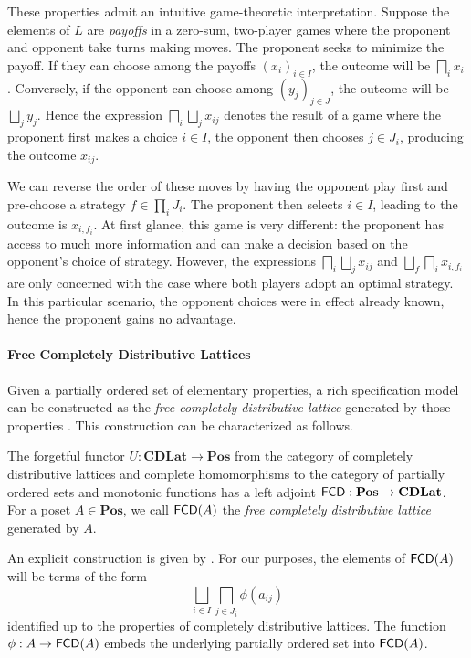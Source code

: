 \documentclass[sigplan,10pt,authordraft]{acmart}
\begin{document}
These properties admit an intuitive game-theoretic interpretation.
Suppose the elements of $L$
are \emph{payoffs} in a zero-sum, two-player games
where the proponent and opponent
take turns making moves.
The proponent seeks to minimize the payoff.
If they can choose among the payoffs $(x_i)_{i \in I}$,
the outcome will be $\bigsqcap_i x_i$.
Conversely,
if the opponent can choose among $(y_j)_{j \in J}$,
the outcome will be $\bigsqcup_j y_j$.
Hence the expression
$\bigsqcap_i \bigsqcup_j x_{ij}$
denotes the result of a game where
the proponent first makes a choice $i \in I$,
the opponent then chooses $j \in J_i$,
producing the outcome $x_{ij}$.

We can reverse the order of these moves
by having the opponent play first
and pre-choose a strategy $f \in \prod_i J_i$.
The proponent then selects $i \in I$,
leading to the outcome is $x_{i,f_i}$.
At first glance,
this game is very different:
the proponent has access to much more information
and can make a decision based on the opponent's choice of strategy.
However,
the expressions $\bigsqcap_i \bigsqcup_j x_{ij}$
and $\bigsqcup_f \bigsqcap_i x_{i,f_i}$
are only concerned with the case where both players adopt
an optimal strategy.
In this particular scenario,
the opponent choices were in effect already known,
hence the proponent gains no advantage.

\paragraph{Free Completely Distributive Lattices}

Given a partially ordered set of elementary properties,
a rich specification model can be constructed as
the \emph{free completely distributive lattice}
generated by those properties \cite{augtyp,dndf}.
This construction can be characterized as follows.

\begin{definition}
The forgetful functor
$U : \mathbf{CDLat} \rightarrow \mathbf{Pos}$
from the category of completely distributive lattices
and complete homomorphisms
to the category of partially ordered sets
and monotonic functions
has a left adjoint
$ \mathsf{FCD}  : \mathbf{Pos} \rightarrow \mathbf{CDLat}$.
For a poset $A \in \mathbf{Pos}$,
we call $ \mathsf{FCD} (A)$ the \emph{free completely distributive lattice}
generated by $A$.
\end{definition}

An explicit construction is given by \citet{augtyp}.
For our purposes,
the elements of $ \mathsf{FCD} (A)$
will be terms of the form
\[
  \bigsqcup_{i \in I} \bigsqcap_{j \in J_i} \phi(a_{ij})
\]
identified up to the properties of completely distributive lattices.
The function $\phi : A \rightarrow  \mathsf{FCD} (A)$
embeds the underlying partially ordered set
into $ \mathsf{FCD} (A)$.
\end{document}
